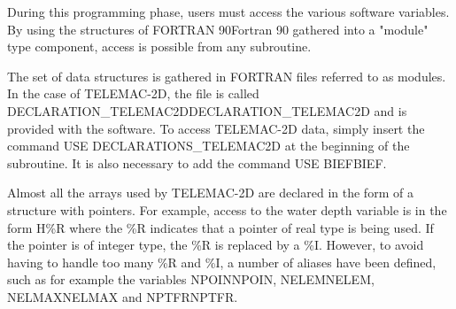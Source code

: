  During this programming phase, users must access the various software variables. By using the structures of FORTRAN 90Fortran 90 gathered into a "module" type component, access is possible from any subroutine.

 The set of data structures is gathered in FORTRAN files referred to as modules. In the case of TELEMAC-2D, the file is called DECLARATION\_TELEMAC2DDECLARATION\_TELEMAC2D and is provided with the software. To access TELEMAC-2D data, simply insert the command USE DECLARATIONS\_TELEMAC2D at the beginning of the subroutine. It is also necessary to add the command USE BIEFBIEF.



 Almost all the arrays used by TELEMAC-2D are declared in the form of a structure with pointers. For example, access to the water depth variable is in the form H\%R where the \%R indicates that a pointer of real type is being used. If the pointer is of integer type, the \%R is replaced by a \%I. However, to avoid having to handle too many \%R and \%I, a number of aliases have been defined, such as for example the variables NPOINNPOIN, NELEMNELEM, NELMAXNELMAX and NPTFRNPTFR.

